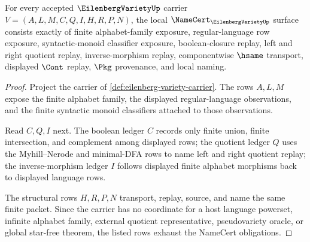 \begin{theorem}
\label{thm:eilenberg-variety-namecert-obligations}
For every accepted $\EilenbergVarietyUp$ carrier $V=(A,L,M,C,Q,I,H,R,P,N)$, the local $\NameCert_{\EilenbergVarietyUp}$ surface consists exactly of finite alphabet-family exposure, regular-language row exposure, syntactic-monoid classifier exposure, boolean-closure replay, left and right quotient replay, inverse-morphism replay, componentwise $\hsame$ transport, displayed $\Cont$ replay, $\Pkg$ provenance, and local naming.
\end{theorem}
\begin{proof}
Project the carrier of \autoref{def:eilenberg-variety-carrier}. The rows $A,L,M$ expose the finite alphabet family, the displayed regular-language observations, and the finite syntactic monoid classifiers attached to those observations.

Read $C,Q,I$ next. The boolean ledger $C$ records only finite union, finite intersection, and complement among displayed rows; the quotient ledger $Q$ uses the Myhill--Nerode and minimal-DFA rows to name left and right quotient replay; the inverse-morphism ledger $I$ follows displayed finite alphabet morphisms back to displayed language rows.

The structural rows $H,R,P,N$ transport, replay, source, and name the same finite packet. Since the carrier has no coordinate for a host language powerset, infinite alphabet family, external quotient representative, pseudovariety oracle, or global star-free theorem, the listed rows exhaust the NameCert obligations.
\end{proof}

